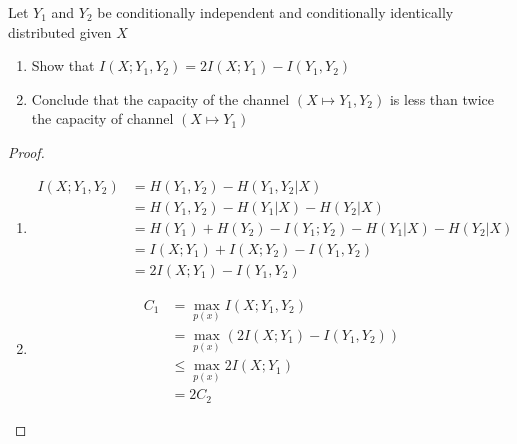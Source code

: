\begin{exercise}{ Let $Y_{1}$ and $Y_{2}$ be conditionally independent and conditionally identically distributed given
  $X$
  \begin{enumerate}
    \item Show that $I\left(X ; Y_{1}, Y_{2}\right)=2 I\left(X ; Y_{1}\right)-I\left(Y_{1}, Y_{2}\right)$
    \item Conclude that the capacity of the channel $(X\mapsto Y_1,Y_2)$ is less than twice the capacity of channel $(X \mapsto Y_1)$
  \end{enumerate} }
  \begin{proof}
  \par{~}
  \begin{enumerate}
    \item {
      \begin{equation}
        \begin{aligned}
          I(X;Y_1,Y_2) &= H(Y_1,Y_2) - H(Y_1,Y_2|X) \\
          &= H(Y_1,Y_2) - H(Y_1|X) - H(Y_2|X) \\
          &= H(Y_1) + H(Y_2) - I(Y_1;Y_2) -  H(Y_1|X) - H(Y_2|X) \\
          &=I(X;Y_1) + I(X;Y_2)- I(Y_1,Y_2) \\
          &= 2I(X;Y_1) - I(Y_1,Y_2)
        \end{aligned}
      \end{equation}
     }
    \item { 
\begin{equation}
  \begin{aligned}
    C_1 &= \max_{p(x)} I(X;Y_1,Y_2) \\
    &= \max_{p(x)} (2I(X;Y_1) - I(Y_1,Y_2)) \\
    &\le \max_{p(x)} 2I(X;Y_1) \\
    &= 2C_2
  \end{aligned}
\end{equation}
    }
  \end{enumerate}
  \end{proof}
  \label{ex7-2}
\end{exercise}

